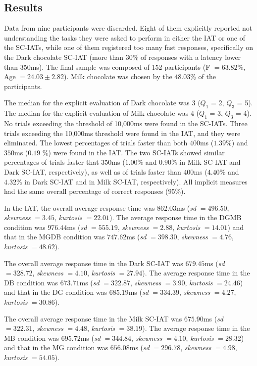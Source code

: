 \documentclass[12pt]{book}
\begin{document}
\subsection{Results}\label{fairer:results}

Data from nine participants were discarded. Eight of them explicitly reported not understanding the tasks they were asked to perform in either the IAT or one of the SC-IATs, while one of them registered too many fast responses, specifically on the Dark chocolate SC-IAT (more than 30\% of responses with a latency lower than 350ms). 
The final sample was composed of 152 participants (F $= 63.82$\%, Age $= 24.03 \pm 2.8$2). Milk chocolate was chosen by the $48.03$\% of the participants. 

The median for the explicit evaluation of Dark chocolate was 3 ($Q_{1}$ = 2, $Q_{3}$ = 5). The median for the explicit evaluation of Milk chocolate was 4 ($Q_1$ = 3, $Q_3$ = 4). No trials exceeding the threshold of 10,000ms were found in the SC-IATs. Three trials exceeding the 10,000ms threshold were found in the IAT, and they were eliminated. 
The lowest percentages of trials faster than both $400$ms ($1.39$\%) and $350$ms ($0.19$ \%) were found in the IAT. The two SC-IATs showed similar percentages of trials faster that $350$ms ($1.00$\% and $0.90$\% in Milk SC-IAT and Dark SC-IAT, respectively), as well as of trials faster than $400$ms ($4.40$\% and $4.32$\% in Dark SC-IAT and in Milk SC-IAT, respectively).
All implicit measures had the same overall percentage of correct responses ($95$\%).

In the IAT, the overall average response time was $862.03$ms (\emph{sd} $= 496.50$, \emph{skewness} $= 3.45$, \emph{kurtosis} $= 22.01$). The average response time in the DGMB condition was $976.44$ms (\emph{sd} $= 555.19$, \emph{skewness} $= 2.88$, \emph{kurtosis} $= 14.01$) and that in the MGDB condition was $747.62$ms (\emph{sd} $= 398.30$, \emph{skewness} $= 4.76$, \emph{kurtosis} $= 48.62$). 

The overall average response time in the Dark SC-IAT was $679.45$ms (\emph{sd} $= 328.72$, \emph{skewness} $= 4.10$, \emph{kurtosis} $= 27.94$). The average response time in the DB condition was $673.71$ms (\emph{sd} $= 322.87$, \emph{skewness} $= 3.90$, \emph{kurtosis} $= 24.46$) and that in the DG condition was $685.19$ms (\emph{sd} $= 334.39$, \emph{skewness} $= 4.27$, \emph{kurtosis} $= 30.86$). 

The overall average response time in the Milk SC-IAT was $675.90$ms (\emph{sd} $= 322.31$, \emph{skewness} $= 4.48$, \emph{kurtosis} $= 38.19$). The average response time in the MB condition was $695.72$ms (\emph{sd} $= 344.84$, \emph{skewness} $= 4.10$, \emph{kurtosis} $= 28.32$) and that in the MG condition was $656.08$ms (\emph{sd} $= 296.78$, \emph{skewness} $= 4.98$, \emph{kurtosis} $= 54.05$). 
\end{document}
